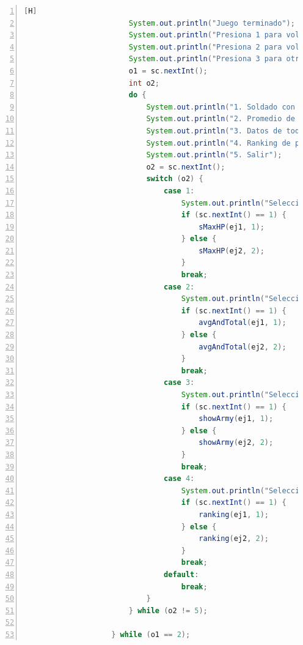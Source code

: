 \documentclass{article}
\begin{document}
\begin{lstlisting}[language=java,caption={Menú de Partida Rápida}, numbers=left][H]
                        System.out.println("Juego terminado");
                        System.out.println("Presiona 1 para volver al menu principal");
                        System.out.println("Presiona 2 para volver a jugar");
                        System.out.println("Presiona 3 para otras opciones: ");
                        o1 = sc.nextInt();
                        int o2;
                        do {
                            System.out.println("1. Soldado con mayor vida");
                            System.out.println("2. Promedio de vida y total");
                            System.out.println("3. Datos de todos los soldados");
                            System.out.println("4. Ranking de poder");
                            System.out.println("5. Salir");
                            o2 = sc.nextInt();
                            switch (o2) {
                                case 1:
                                    System.out.println("Seleccione ejercito: ");
                                    if (sc.nextInt() == 1) {
                                        sMaxHP(ej1, 1);
                                    } else {
                                        sMaxHP(ej2, 2);
                                    }
                                    break;
                                case 2:
                                    System.out.println("Seleccione ejercito: ");
                                    if (sc.nextInt() == 1) {
                                        avgAndTotal(ej1, 1);
                                    } else {
                                        avgAndTotal(ej2, 2);
                                    }
                                    break;
                                case 3:
                                    System.out.println("Seleccione ejercito: ");
                                    if (sc.nextInt() == 1) {
                                        showArmy(ej1, 1);
                                    } else {
                                        showArmy(ej2, 2);
                                    }
                                    break;
                                case 4:
                                    System.out.println("Seleccione ejercito: ");
                                    if (sc.nextInt() == 1) {
                                        ranking(ej1, 1);
                                    } else {
                                        ranking(ej2, 2);
                                    }
                                    break;
                                default:
                                    break;
                            }
                        } while (o2 != 5);

                    } while (o1 == 2);
	\end{lstlisting}
	
\end{document}
